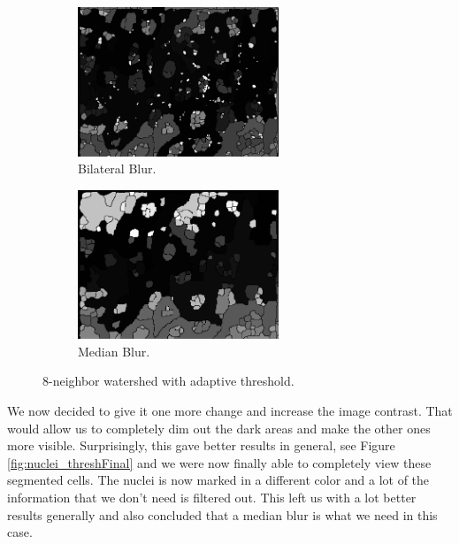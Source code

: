 \documentclass{article}
\begin{document}
\begin{figure}[H]
\centering
\begin{subfigure}{6cm}
  \centering
  \includegraphics[width=6cm]{experiments/nuclei/bilateralThresh_nucleiseg.png}
  \caption{Bilateral Blur.}
\end{subfigure}    
\begin{subfigure}{6cm}
  \centering
  \includegraphics[width=6cm]{experiments/nuclei/medianThres_nucleiseg.png}
  \caption{Median Blur.}
\end{subfigure}
\caption{8-neighbor watershed with adaptive threshold.}
\label{fig:nuclei_blurcomp}
\end{figure}
\begin{flushleft}
We now decided to give it one more change and increase the image contrast. That would allow us to completely dim out the dark areas and make the other ones more visible. Surprisingly, this gave better results in general, see Figure \ref{fig:nuclei_threshFinal} and we were now finally able to completely view these segmented cells. The nuclei is now marked in a different color and a lot of the information that we don't need is filtered out. This left us with a lot better results generally and also concluded that a median blur is what we need in this case.
\end{flushleft}
\end{document}
